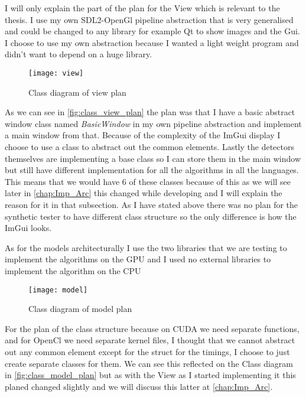 I will only explain the part of the plan for the View which is relevant to the thesis. I use my own \ac{SDL2}-OpenGl pipeline abstraction that is very generalised and could be changed to any library for example Qt to show images and the Gui. I choose to use my own abstraction because I wanted a light weight program and didn't want to depend on a huge library. 

\begin{figure}[H]
\centering
\texttt{[image: view]}
\caption{Class diagram of view plan}
\label{fig:class_view_plan}
\end{figure}

As we can see in \autoref{fig:class_view_plan} the plan was that I have a basic abstract window class named \textit{BasicWindow} in my own pipeline abstraction and implement a main window from that. Because of the complexity of the ImGui display I choose to use a class to abstract out the common elements. Lastly the detectors themselves are implementing a base class so I can store them in the main window but still have different implementation for all the algorithms in all the languages. This means that we would have 6 of these classes because of this as we will see later in \autoref{chap:Imp_Arc} this changed while developing and I will explain the reason for it in that subsection. As I have stated above there was no plan for the synthetic tester to have different class structure so the only difference is how the ImGui looks.

As for the models architecturally I use the two libraries that we are testing to implement the algorithms on the \ac{GPU} and I used no external libraries to implement the algorithm on the \ac{CPU}

\begin{figure}[H]
\centering
\texttt{[image: model]}
\caption{Class diagram of model plan}
\label{fig:class_model_plan}
\end{figure}

For the plan of the class structure because on CUDA we need separate functions, and for OpenCl we need separate kernel files, I thought that we cannot abstract out any common element except for the struct for the timings, I choose to just create separate classes for them. We can see this reflected on the Class diagram in \autoref{fig:class_model_plan} but as with the View as I started implementing it this planed changed slightly and we will discuss this latter at \autoref{chap:Imp_Arc}.

